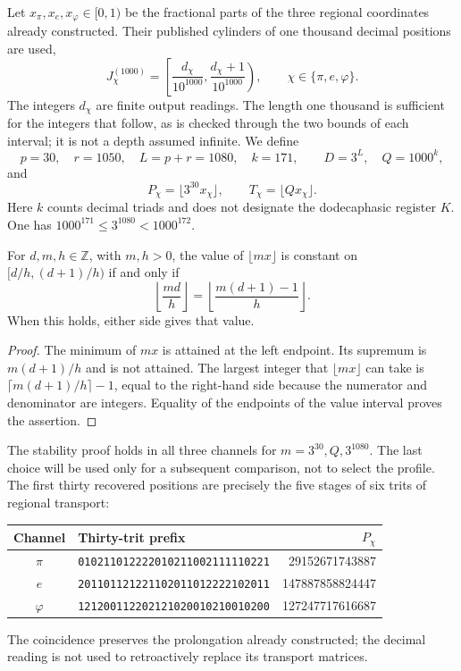 Let \(x_\pi,x_e,x_\varphi\in[0,1)\) be the fractional parts of the
three regional coordinates already constructed. Their published cylinders
of one thousand decimal positions are used,
\[
 J_\chi^{(1000)}=
 \left[\frac{d_\chi}{10^{1000}},
       \frac{d_\chi+1}{10^{1000}}\right),
 \qquad \chi\in\{\pi,e,\varphi\}.
\]
The integers \(d_\chi\) are finite output readings. The length one thousand
is sufficient for the integers that follow, as is checked through the
two bounds of each interval; it is not a depth assumed infinite.
We define
\begin{equation}
 p=30,\quad r=1050,\quad L=p+r=1080,\quad k=171,
 \qquad D=3^L,\quad Q=1000^k,
 \label{x_reciprocidad:censo:parametros}
\end{equation}
and
\[
 P_\chi=\lfloor3^{30}x_\chi\rfloor,\qquad
 T_\chi=\lfloor Qx_\chi\rfloor.
\]
Here \(k\) counts decimal triads and does not designate the dodecaphasic register
\(K\). One has \(1000^{171}\leq3^{1080}<1000^{172}\).

\begin{lemma}
\label{x_reciprocidad:censo:estabilidad}
For \(d,m,h\in\mathbb Z\), with \(m,h>0\), the value of
\(\lfloor mx\rfloor\) is constant on \([d/h,(d+1)/h)\) if and only if
\begin{equation}
 \left\lfloor\frac{md}{h}\right\rfloor
 =\left\lfloor\frac{m(d+1)-1}{h}\right\rfloor.
 \label{x_reciprocidad:censo:prueba-estabilidad}
\end{equation}
When this holds, either side gives that value.
\end{lemma}
\begin{proof}
The minimum of \(mx\) is attained at the left endpoint. Its supremum
is \(m(d+1)/h\) and is not attained. The largest integer that
\(\lfloor mx\rfloor\) can take is
\(\lceil m(d+1)/h\rceil-1\), equal to the right-hand side because
the numerator and denominator are integers. Equality of the endpoints
of the value interval proves the assertion.
\end{proof}

The stability proof holds in all three channels for
\(m=3^{30},Q,3^{1080}\). The last choice will be used only
for a subsequent comparison, not to select the profile. The
first thirty recovered positions are precisely the five
stages of six trits of regional transport:
\begin{center}\small
\begin{tabular}{@{}c l r@{}}\toprule
Channel&Thirty-trit prefix&\(P_\chi\)\\\midrule
\(\pi\)&\texttt{010211012222010211002111110221}&29152671743887\\
\(e\)&\texttt{201101121221102011012222102011}&147887858824447\\
\(\varphi\)&\texttt{121200112202121020010210010200}&127247717616687\\\bottomrule
\end{tabular}
\end{center}
The coincidence preserves the prolongation already constructed; the decimal reading
is not used to retroactively replace its transport matrices.

